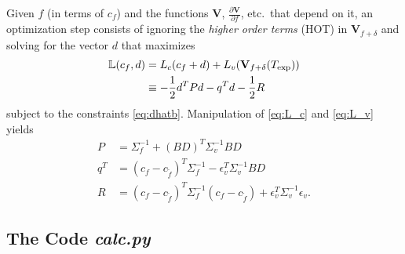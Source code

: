 \documentclass[11pt]{article}
\newcommand{\partiald}[2]{\frac{\partial #1}{\partial #2}}
\newcommand\Vt{\mathbf{V}}
\newcommand\texp{T_{\rm{exp}}}
\newcommand\cf{c_f}
\newcommand\DVDf{\partiald{\Vt}{f}}
\newcommand\Lbb{\mathbb{L}}
\newcommand\epv{\epsilon_v}
\begin{document}
Given $f$ (in terms of $\cf$) and the functions $\Vt$, $\DVDf$, etc.\
that depend on it, an optimization step consists of ignoring the
\emph{higher order terms} (HOT) in $\Vt_{f+\delta}$ and solving for
the vector $d$ that maximizes
\begin{align}
  \label{eq:L}
  \Lbb(\cf,d) &= L_c(\cf + d) + L_v(\Vt_{f+\delta}(\texp)) \\
  & \equiv -\frac{1}{2} d^T P d - q^T d -
    \frac{1}{2} R
\end{align}
subject to the constraints \eqref{eq:dhatb}.  Manipulation of
\eqref{eq:L_c} and \eqref{eq:L_v} yields
\label{eq:PqR}
\begin{subequations}
  \begin{align}
    P &= \Sigma_f^{-1} + (BD)^T \Sigma_v^{-1} BD \\
    q^T &= (\cf - c_{\tilde f})^T \Sigma_f^{-1} - \epv^T
          \Sigma_v^{-1} BD  \\
    \label{eq:R}
    R &= (\cf - c_{\tilde f})^T \Sigma_f^{-1} (\cf - c_{\tilde f}) +
        \epv^T \Sigma_v^{-1} \epv.
  \end{align}
\end{subequations}

\subsection{The Code \emph{calc.py}}
\label{sec:code}
\end{document}
